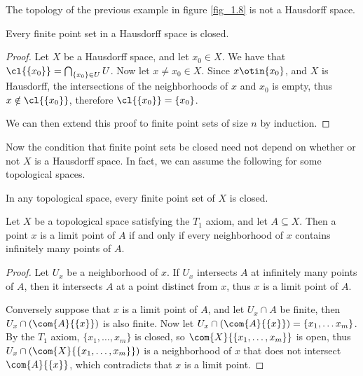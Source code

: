 \begin{example}
    The topology of the previous example in figure \ref{fig_1.8} is not a
    Hausdorff space.
\end{example}

\begin{theorem}\label{1.6.8}
    Every finite point set in a Hausdorff space is closed.
\end{theorem}
\begin{proof}
    Let $X$ be a Hausdorff space, and let  $x_0 \in X$. We have that
    $\cl{\{x_0\}}=\bigcap_{\{x_0\} \in U}{U}$. Now let $x \neq x_0 \in X$.
    Since $x \otin \{x_0\}$, and $X$ is Hausdorff, the intersections of the
    neighborhoods of $x$ and  $ x_0$ is empty, thus $x \notin \cl{\{x_0\}}$,
    therefore $\cl{\{x_0\}}=\{x_0\}$.

    We can then extend this proof to finite point sets of size $n$ by induction.
\end{proof}

Now the condition that finite point sets be closed need not depend on whether or
not $X$ is a Hausdorff space. In fact, we can assume the following for some
topological spaces.

\begin{axiom}\label{axm1.6.1}
    In any topological space, every finite point set of $X$ is closed.
\end{axiom}

\begin{theorem}\label{1.6.9}
    Let $X$ be a topological space satisfying the $ T_1$ axiom, and let $A
    \subseteq X$. Then a point  $x$ is a limit point of  $A$ if and only if
    every neighborhood of  $x$ contains infinitely many points of  $A$.
\end{theorem}
\begin{proof}
    Let $U_x$ be a neighborhood of  $x$. If  $U_x$ intersects $A$ at infinitely
    many points of  $A$, then it intersects  $A$ at a point distinct from  $x$,
    thus  $x$ is a limit point of  $A$.

    Conversely suppose that  $x$ is a limit point of  $A$, and let  $U_x \cap A$
    be finite, then  $U_x \cap (\com{A}{\{x\}})$ is also  finite. Now let
    $U_x \cap (\com{A}{\{x\}})=\{x_1, \dots x_m\}$. By the $T_1$ axiom,
    $\{x_1, \dots, x_m\}$ is closed, so $\com{X}{\{x_1, \dots, x_m\}}$ is open,
    thus $U_x \cap (\com{X}{\{x_1, \dots, x_m\}})$ is a neighborhood of $x$ that
    does not intersect  $\com{A}{\{x\}}$, which contradicts that  $x$ is a
    limit point.
\end{proof}

